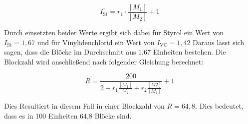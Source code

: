 \documentclass[10pt,a4paper,ngerman]{scrartcl}
\begin{document}
			\begin{equation}
				\bar{I_\text{St}} = r_1 \cdot \frac{[M_1]}{[M_2]} + 1
			\end{equation}
				
		Durch einsetzten beider Werte ergibt sich dabei für Styrol ein Wert von $\bar{I_\text{St}} = 1,67$ 
		und für Vinylidenchlorid ein Wert von $\bar{I_\text{VC}} = 1,42$
		Daraus lässt sich sagen, dass die Blöcke im Durchschnitt aus 1,67 Einheiten bestehen.
		Die Blockzahl wird anschließend nach folgender Gleichung berechnet:
		
			 \begin{equation}
				R = \frac{200}{2 + r_1 \frac{[M_1]}{M_2} + r_2 \frac{[M2]}{[M_1]}} + 1
			 \end{equation}
		
		Dies Resultiert in diesem Fall in einer Blockzahl von $R = 64,8$. Dies bedeutet, dass es in 100 Einheiten 64,8 Blöcke sind.
\printbibliography
\end{document}
